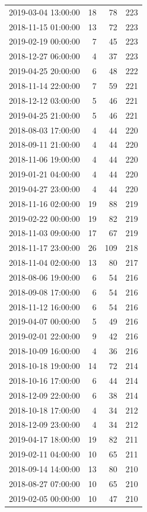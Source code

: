 \begin{tabular}{lrrr}
2019-03-04 13:00:00 & 18 & 78 & 223 \\
2018-11-15 01:00:00 & 13 & 72 & 223 \\
2019-02-19 00:00:00 & 7 & 45 & 223 \\
2018-12-27 06:00:00 & 4 & 37 & 223 \\
2019-04-25 20:00:00 & 6 & 48 & 222 \\
2018-11-14 22:00:00 & 7 & 59 & 221 \\
2018-12-12 03:00:00 & 5 & 46 & 221 \\
2019-04-25 21:00:00 & 5 & 46 & 221 \\
2018-08-03 17:00:00 & 4 & 44 & 220 \\
2018-09-11 21:00:00 & 4 & 44 & 220 \\
2018-11-06 19:00:00 & 4 & 44 & 220 \\
2019-01-21 04:00:00 & 4 & 44 & 220 \\
2019-04-27 23:00:00 & 4 & 44 & 220 \\
2018-11-16 02:00:00 & 19 & 88 & 219 \\
2019-02-22 00:00:00 & 19 & 82 & 219 \\
2018-11-03 09:00:00 & 17 & 67 & 219 \\
2018-11-17 23:00:00 & 26 & 109 & 218 \\
2018-11-04 02:00:00 & 13 & 80 & 217 \\
2018-08-06 19:00:00 & 6 & 54 & 216 \\
2018-09-08 17:00:00 & 6 & 54 & 216 \\
2018-11-12 16:00:00 & 6 & 54 & 216 \\
2019-04-07 00:00:00 & 5 & 49 & 216 \\
2019-02-01 22:00:00 & 9 & 42 & 216 \\
2018-10-09 16:00:00 & 4 & 36 & 216 \\
2018-10-18 19:00:00 & 14 & 72 & 214 \\
2018-10-16 17:00:00 & 6 & 44 & 214 \\
2018-12-09 22:00:00 & 6 & 38 & 214 \\
2018-10-18 17:00:00 & 4 & 34 & 212 \\
2018-12-09 23:00:00 & 4 & 34 & 212 \\
2019-04-17 18:00:00 & 19 & 82 & 211 \\
2019-02-11 04:00:00 & 10 & 65 & 211 \\
2018-09-14 14:00:00 & 13 & 80 & 210 \\
2018-08-27 07:00:00 & 10 & 65 & 210 \\
2019-02-05 00:00:00 & 10 & 47 & 210 \\

\end{tabular}
